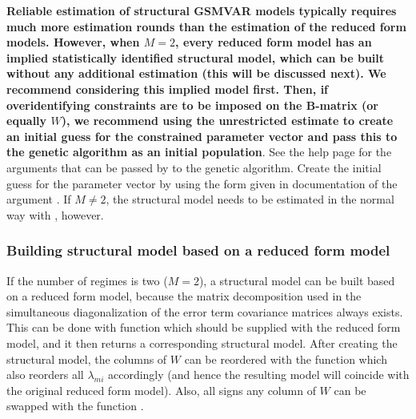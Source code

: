 \documentclass[nojss]{jss}
\begin{document}
\textbf{Reliable estimation of structural GSMVAR models typically requires much more estimation rounds than the estimation of the reduced form models. However, when $M=2$, every reduced form model has an implied statistically identified structural model, which can be built without any additional estimation (this will be discussed next). We recommend considering this implied model first. Then, if overidentifying constraints are to be imposed on the B-matrix (or equally $W$), we recommend using the unrestricted estimate to create an initial guess for the constrained parameter vector and pass this to the genetic algorithm as an initial population}. See the help page  for the arguments that can be passed by  to the genetic algorithm. Create the initial guess for the parameter vector by using the form given in documentation of the argument . If $M\neq 2$, the structural model needs to be estimated in the normal way with , however.

\subsubsection{Building structural model based on a reduced form model}

If the number of regimes is two ($M=2$), a structural model can be built based on a reduced form model, because the matrix decomposition used in the simultaneous diagonalization of the error term covariance matrices always exists. This can be done with function  which should be supplied with the reduced form model, and it then returns a corresponding structural model. After creating the structural model, the columns of $W$ can be reordered with the function  which also reorders all $\lambda_{mi}$ accordingly (and hence the resulting model will coincide with the original reduced form model). Also, all signs any column of $W$ can be swapped with the function .
\end{document}
